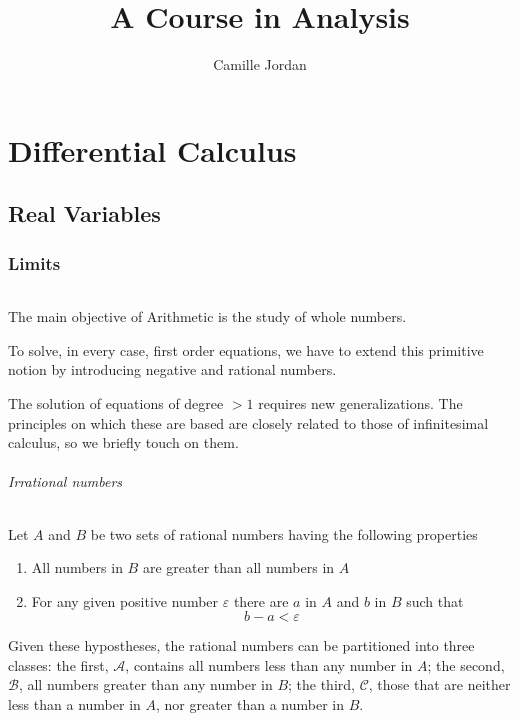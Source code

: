 \documentclass[10pt,letterpaper]{book}
\title{A Course in Analysis}
\author{Camille Jordan}
\renewcommand\epsilon{\varepsilon}
\theoremstyle{definition}
\begin{document}
\maketitle
\tableofcontents


\part{Differential Calculus}

\chapter{Real Variables}

\section{Limits}

\paragraph{} 
The main objective of Arithmetic is the study of whole numbers.

To solve, in every case, first order equations, we have to extend this primitive notion by introducing negative and rational numbers.

The solution of equations of degree $> 1$ requires new generalizations. The principles on which these are based are closely related to those of infinitesimal calculus, so we briefly touch on them.


\paragraph{Irrational numbers}\label{par:irrational-numbers} Let $A$ and $B$ be two sets of rational numbers having the following properties
\begin{enumerate}
\item All numbers in $B$ are greater than all numbers in $A$
\item For any given positive number $\epsilon$ there are $a$ in $A$ and $b$ in $B$ such that
\[
  b - a < \epsilon
\]
\end{enumerate}
Given these hypostheses, the rational numbers can be partitioned into three classes: the first, $\mathcal{A}$, contains all numbers less than any number in $A$; the second, $\mathcal B$, all numbers greater than any number in $B$; the third, $\mathcal C$, those that are neither less than a number in $A$, nor greater than a number in $B$.
\end{document}
